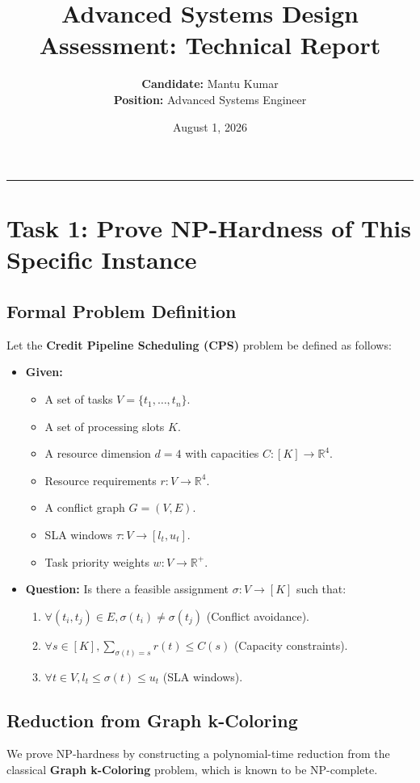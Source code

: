 \documentclass[11pt,a4paper]{article}
\title{\textbf{Advanced Systems Design Assessment: Technical Report}}
\author{\textbf{Candidate:} Mantu Kumar \\ \textbf{Position:} Advanced Systems Engineer}
\date{August 1, 2026}
\begin{document}
\maketitle

\hrule
\vspace{0.4cm}

\section{Task 1: Prove NP-Hardness of This Specific Instance}

\subsection{Formal Problem Definition}
Let the \textbf{Credit Pipeline Scheduling (CPS)} problem be defined as follows:
\begin{itemize}
    \item \textbf{Given:}
    \begin{itemize}
        \item A set of tasks $V = \{t_1, \dots, t_n\}$.
        \item A set of processing slots $K$.
        \item A resource dimension $d = 4$ with capacities $C: [K] \to \mathbb{R}^4$.
        \item Resource requirements $r: V \to \mathbb{R}^4$.
        \item A conflict graph $G = (V, E)$.
        \item SLA windows $\tau: V \to [l_t, u_t]$.
        \item Task priority weights $w: V \to \mathbb{R}^+$.
    \end{itemize}
    \item \textbf{Question:} Is there a feasible assignment $\sigma: V \to [K]$ such that:
    \begin{enumerate}
        \item $\forall (t_i, t_j) \in E, \sigma(t_i) \neq \sigma(t_j)$ (Conflict avoidance).
        \item $\forall s \in [K], \sum_{\sigma(t)=s} r(t) \le C(s)$ (Capacity constraints).
        \item $\forall t \in V, l_t \le \sigma(t) \le u_t$ (SLA windows).
    \end{enumerate}
\end{itemize}

\subsection{Reduction from Graph k-Coloring}
We prove NP-hardness by constructing a polynomial-time reduction from the classical \textbf{Graph k-Coloring} problem, which is known to be NP-complete.
\end{document}
